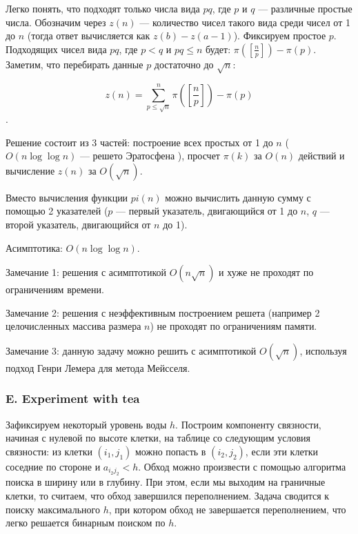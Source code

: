 
Легко понять, что подходят только числа вида $pq$, где $p$ и $q$ --- различные простые числа. Обозначим через $z(n)$ --- количество чисел такого вида среди чисел от 1 до $n$ (тогда ответ вычисляется как $z(b) - z(a-1)$). Фиксируем простое $p$. Подходящих чисел вида $pq$, где $p < q$ и $pq \le n$ будет: $ \pi\left( \left[ \frac{n}{p} \right] \right) - \pi(p)$. Заметим, что перебирать данные $p$ достаточно до $\sqrt{n}$:

$$z(n) = \sum_{p \le \sqrt{n}}^{n} \pi\left(\left[ \frac{n}{p} \right] \right) - \pi(p)$$.

Решение состоит из 3 частей: построение всех простых от 1 до $n$ ($O(n \log \log{n})$ --- решето Эратосфена ), просчет $\pi(k)$ за $O(n)$ действий и вычисление $z(n)$ за $O(\sqrt{n})$. 

Вместо вычисления функции $pi(n)$ можно вычислить данную сумму с помощью 2 указателей ($p$ --- первый указатель, двигающийся от 1 до $n$, $q$ --- второй указатель, двигающийся от $n$ до 1).

Асимптотика: $O(n \log \log{n})$. 

Замечание 1: решения с асимптотикой $O(n \sqrt{n})$ и хуже не проходят по ограничениям времени.

Замечание 2: решения с неэффективным построением решета (например 2 целочисленных массива размера $n$) не проходят по ограничениям памяти.

Замечание 3: данную задачу можно решить с асимптотикой $O( \sqrt{n} )$, используя подход Генри Лемера для метода Мейсселя.



\subsubsection*{E. Experiment with tea} 


Зафиксируем некоторый уровень воды $h$. Построим компоненту связности, начиная с нулевой по высоте клетки, на таблице со следующим условия связности: из клетки $(i_1, j_1)$ можно попасть в $(i_2, j_2)$, если эти клетки соседние по стороне и $a_{i_2 j_2} < h$. Обход можно произвести с помощью алгоритма поиска в ширину или в глубину. При этом, если мы выходим на граничные клетки, то считаем, что обход завершился переполнением. Задача сводится к поиску максимального $h$, при котором обход не завершается переполнением, что легко решается бинарным поиском по $h$.

